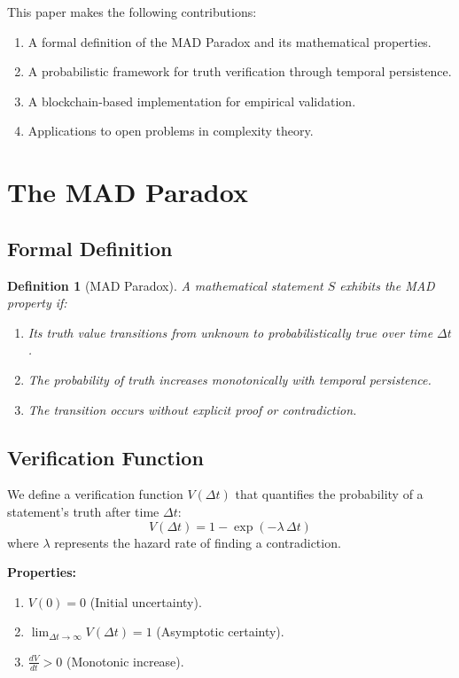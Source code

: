 \documentclass[11pt]{article}
\newtheorem{definition}{Definition}[section]
\begin{document}
This paper makes the following contributions:
\begin{enumerate}[label=(\arabic*)]
    \item A formal definition of the MAD Paradox and its mathematical properties.
    \item A probabilistic framework for truth verification through temporal persistence.
    \item A blockchain-based implementation for empirical validation.
    \item Applications to open problems in complexity theory.
\end{enumerate}

\section{The MAD Paradox}

\subsection{Formal Definition}

\begin{definition}[MAD Paradox]
A mathematical statement $S$ exhibits the MAD property if:
\begin{enumerate}[label=(\arabic*)]
    \item Its truth value transitions from unknown to probabilistically true over time $\Delta t$.
    \item The probability of truth increases monotonically with temporal persistence.
    \item The transition occurs without explicit proof or contradiction.
\end{enumerate}
\end{definition}

\subsection{Verification Function}

We define a verification function $V(\Delta t)$ that quantifies the probability of a statement's truth after time $\Delta t$:
\[
V(\Delta t) = 1 - \exp(-\lambda\,\Delta t)
\]
where $\lambda$ represents the hazard rate of finding a contradiction.

\noindent\textbf{Properties:}
\begin{enumerate}[label=(\alph*)]
    \item $V(0) = 0$ (Initial uncertainty).
    \item $\displaystyle \lim_{\Delta t\to\infty} V(\Delta t) = 1$ (Asymptotic certainty).
    \item $\displaystyle \frac{dV}{dt} > 0$ (Monotonic increase).
\end{enumerate}
\end{document}

